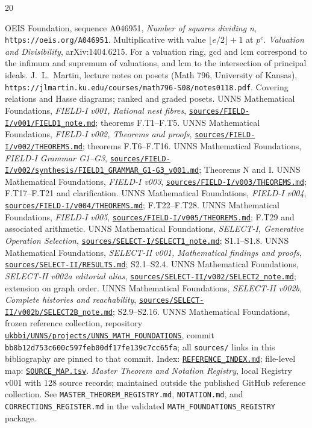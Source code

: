 \documentclass[11pt,oneside,openany]{book}
\theoremstyle{definition}
\theoremstyle{remark}
\newcommand{\srcpath}[1]{\href{https://github.com/ukbbi/UNNS/blob/bb8b12d753c600c597feb00df17fe139c7cc65fa/projects/UNNS_MATH_FOUNDATIONS/sources/#1}{\nolinkurl{sources/#1}}}
\begin{document}
\begin{thebibliography}{20}
\small\raggedright
{} OEIS Foundation, sequence A046951, \emph{Number of squares dividing n}, \texttt{https://oeis.org/A046951}. Multiplicative with value \(\lfloor e/2\rfloor+1\) at \(p^e\).
 \emph{Valuation and Divisibility}, arXiv:1404.6215. For a valuation ring, gcd and lcm correspond to the infimum and supremum of valuations, and lcm to the intersection of principal ideals.
 J.~L.~Martin, lecture notes on posets (Math 796, University of Kansas), \texttt{https://jlmartin.ku.edu/courses/math796-S08/notes0118.pdf}. Covering relations and Hasse diagrams; ranked and graded posets.
 UNNS Mathematical Foundations, \emph{FIELD-I v001, Rational nest fibres}, \srcpath{FIELD-I/v001/FIELD1_note.md}; theorems F.T1--F.T5.
 UNNS Mathematical Foundations, \emph{FIELD-I v002, Theorems and proofs}, \srcpath{FIELD-I/v002/THEOREMS.md}; theorems F.T6--F.T16.
 UNNS Mathematical Foundations, \emph{FIELD-I Grammar G1--G3}, \srcpath{FIELD-I/v002/synthesis/FIELD1_GRAMMAR_G1-G3_v001.md}; Theorems N and I.
 UNNS Mathematical Foundations, \emph{FIELD-I v003}, \srcpath{FIELD-I/v003/THEOREMS.md}; F.T17--F.T21 and clarification.
 UNNS Mathematical Foundations, \emph{FIELD-I v004}, \srcpath{FIELD-I/v004/THEOREMS.md}; F.T22--F.T28.
 UNNS Mathematical Foundations, \emph{FIELD-I v005}, \srcpath{FIELD-I/v005/THEOREMS.md}; F.T29 and associated arithmetic.
 UNNS Mathematical Foundations, \emph{SELECT-I, Generative Operation Selection}, \srcpath{SELECT-I/SELECT1_note.md}; S1.1--S1.8.
 UNNS Mathematical Foundations, \emph{SELECT-II v001, Mathematical findings and proofs}, \srcpath{SELECT-II/RESULTS.md}; S2.1--S2.4.
 UNNS Mathematical Foundations, \emph{SELECT-II v002a editorial alias}, \srcpath{SELECT-II/v002/SELECT2_note.md}; extension on graph order.
 UNNS Mathematical Foundations, \emph{SELECT-II v002b, Complete histories and reachability}, \srcpath{SELECT-II/v002b/SELECT2B_note.md}; S2.9--S2.16.
 UNNS Mathematical Foundations, frozen reference collection, repository \href{https://github.com/ukbbi/UNNS/tree/bb8b12d753c600c597feb00df17fe139c7cc65fa/projects/UNNS_MATH_FOUNDATIONS}{\nolinkurl{ukbbi/UNNS/projects/UNNS_MATH_FOUNDATIONS}}, commit \texttt{bb8b12d753c600c597feb00df17fe139c7cc65fa}; all \texttt{sources/} links in this bibliography are pinned to that commit. Index: \href{https://github.com/ukbbi/UNNS/blob/bb8b12d753c600c597feb00df17fe139c7cc65fa/projects/UNNS_MATH_FOUNDATIONS/REFERENCE_INDEX.md}{\nolinkurl{REFERENCE_INDEX.md}}; file-level map: \href{https://github.com/ukbbi/UNNS/blob/bb8b12d753c600c597feb00df17fe139c7cc65fa/projects/UNNS_MATH_FOUNDATIONS/SOURCE_MAP.tsv}{\nolinkurl{SOURCE_MAP.tsv}}.
 \emph{Master Theorem and Notation Registry}, local Registry v001 with 128 source records; maintained outside the published GitHub reference collection. See \texttt{MASTER\_THEOREM\_REGISTRY.md}, \texttt{NOTATION.md}, and \texttt{CORRECTIONS\_REGISTER.md} in the validated \texttt{MATH\_FOUNDATIONS\_REGISTRY} package.
\end{thebibliography}
\backmatter
\end{document}
